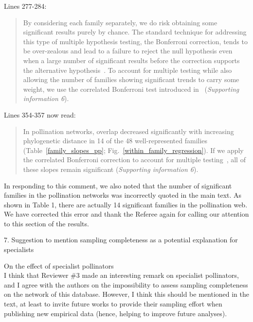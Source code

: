 \documentclass[12pt]{letter}
\newenvironment{refquote}{\bigskip \begin{it}}{\end{it}\smallskip}
\begin{document}
		Lines 277-284:

		\begin{quotation}

			By considering each family separately, we do risk obtaining some significant results purely by chance. The standard technique for addressing this type of multiple hypothesis testing, the Bonferroni correction, tends to be over-zealous and lead to a failure to reject the null hypothesis even when a large number of significant results before the correction supports the alternative hypothesis~\citep{Moran2003}. To account for multiple testing while also allowing the number of families showing significant trends to carry some weight, we use the correlated Bonferroni test introduced in~\citet{Drezner2016} (\emph{Supporting information 6}).

		\end{quotation}


		Lines 354-357 now read:


		\begin{quotation}

			 In pollination networks, overlap decreased significantly with increasing phylogenetic distance in 14 of the 48 well-represented families (Table~\ref{family_slopes_pp}; Fig.~\ref{within_family_regression}). If we apply the correlated Bonferroni correction to account for multiple testing~\citep{Drezner2016}, all of these slopes remain significant (\emph{Supporting information 6}).

		\end{quotation}


		In responding to this comment, we also noted that the number of significant families in the pollination networks was incorrectly quoted in the main text. As shown in Table 1, there are actually 14 significant families in the pollination web. We have corrected this error and thank the Referee again for calling our attention to this section of the results.


	7. Suggestion to mention sampling completeness as a potential explanation for specialists


		\begin{refquote}
			On the effect of specialist pollinators\\

			I think that Reviewer \#3 made an interesting remark on specialist pollinators, and I agree with the authors on the impossibility to assess sampling completeness on the network of this database. However, I think this should be mentioned in the text, at least to invite future works to provide their sampling effort when publishing new empirical data (hence, helping to improve future analyses).
		\end{refquote}
\end{document}
